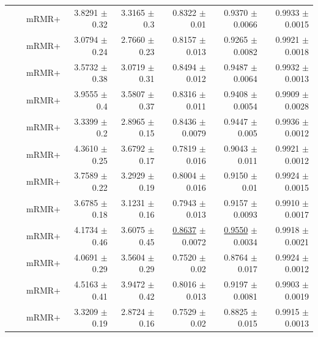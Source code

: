 \begin{longtable}{llp{}rrrrr}
 &  & mRMR+ & 3.8291 {\scriptsize $\pm$ 0.32} & 3.3165 {\scriptsize $\pm$ 0.3} & 0.8322 {\scriptsize $\pm$ 0.01} & 0.9370 {\scriptsize $\pm$ 0.0066} & 0.9933 {\scriptsize $\pm$ 0.0015} \\
 &  & mRMR+ & 3.0794 {\scriptsize $\pm$ 0.24} & 2.7660 {\scriptsize $\pm$ 0.23} & 0.8157 {\scriptsize $\pm$ 0.013} & 0.9265 {\scriptsize $\pm$ 0.0082} & 0.9921 {\scriptsize $\pm$ 0.0018} \\
 &  & mRMR+ & 3.5732 {\scriptsize $\pm$ 0.38} & 3.0719 {\scriptsize $\pm$ 0.31} & 0.8494 {\scriptsize $\pm$ 0.012} & 0.9487 {\scriptsize $\pm$ 0.0064} & 0.9932 {\scriptsize $\pm$ 0.0013} \\
 &  & mRMR+ & 3.9555 {\scriptsize $\pm$ 0.4} & 3.5807 {\scriptsize $\pm$ 0.37} & 0.8316 {\scriptsize $\pm$ 0.011} & 0.9408 {\scriptsize $\pm$ 0.0054} & 0.9909 {\scriptsize $\pm$ 0.0028} \\
 &  & mRMR+ & 3.3399 {\scriptsize $\pm$ 0.2} & 2.8965 {\scriptsize $\pm$ 0.15} & 0.8436 {\scriptsize $\pm$ 0.0079} & 0.9447 {\scriptsize $\pm$ 0.005} & 0.9936 {\scriptsize $\pm$ 0.0012} \\
 &  & mRMR+ & 4.3610 {\scriptsize $\pm$ 0.25} & 3.6792 {\scriptsize $\pm$ 0.17} & 0.7819 {\scriptsize $\pm$ 0.016} & 0.9043 {\scriptsize $\pm$ 0.011} & 0.9921 {\scriptsize $\pm$ 0.0012} \\
 &  & mRMR+ & 3.7589 {\scriptsize $\pm$ 0.22} & 3.2929 {\scriptsize $\pm$ 0.19} & 0.8004 {\scriptsize $\pm$ 0.016} & 0.9150 {\scriptsize $\pm$ 0.01} & 0.9924 {\scriptsize $\pm$ 0.0015} \\
 &  & mRMR+ & 3.6785 {\scriptsize $\pm$ 0.18} & 3.1231 {\scriptsize $\pm$ 0.16} & 0.7943 {\scriptsize $\pm$ 0.013} & 0.9157 {\scriptsize $\pm$ 0.0093} & 0.9910 {\scriptsize $\pm$ 0.0017} \\
 &  & mRMR+ & 4.1734 {\scriptsize $\pm$ 0.46} & 3.6075 {\scriptsize $\pm$ 0.45} & \underline{0.8637} {\scriptsize $\pm$ 0.0072} & \underline{0.9550} {\scriptsize $\pm$ 0.0034} & 0.9918 {\scriptsize $\pm$ 0.0021} \\
 &  & mRMR+ & 4.0691 {\scriptsize $\pm$ 0.29} & 3.5604 {\scriptsize $\pm$ 0.29} & 0.7520 {\scriptsize $\pm$ 0.02} & 0.8764 {\scriptsize $\pm$ 0.017} & 0.9924 {\scriptsize $\pm$ 0.0012} \\
 &  & mRMR+ & 4.5163 {\scriptsize $\pm$ 0.41} & 3.9472 {\scriptsize $\pm$ 0.42} & 0.8016 {\scriptsize $\pm$ 0.013} & 0.9197 {\scriptsize $\pm$ 0.0081} & 0.9903 {\scriptsize $\pm$ 0.0019} \\
 &  & mRMR+ & 3.3209 {\scriptsize $\pm$ 0.19} & 2.8724 {\scriptsize $\pm$ 0.16} & 0.7529 {\scriptsize $\pm$ 0.02} & 0.8825 {\scriptsize $\pm$ 0.015} & 0.9915 {\scriptsize $\pm$ 0.0013} \\

\end{longtable}

